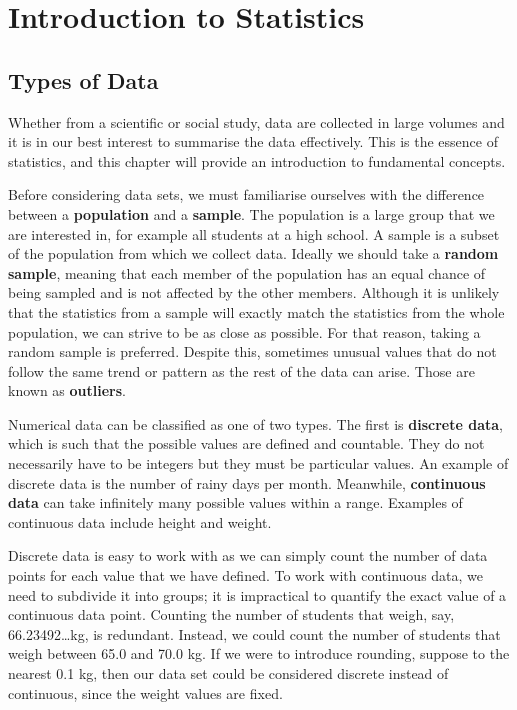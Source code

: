 \chapter{Introduction to Statistics}

\section{Types of Data}
Whether from a scientific or social study, data are collected in large volumes and it is in our best interest to summarise the data effectively. This is the essence of statistics, and this chapter will provide an introduction to fundamental concepts.

Before considering data sets, we must familiarise ourselves with the difference between a \textbf{population} and a \textbf{sample}. The population is a large group that we are interested in, for example all students at a high school. A sample is a subset of the population from which we collect data. Ideally we should take a \textbf{random sample}, meaning that each member of the population has an equal chance of being sampled and is not affected by the other members. Although it is unlikely that the statistics from a sample will exactly match the statistics from the whole population, we can strive to be as close as possible. For that reason, taking a random sample is preferred. Despite this, sometimes unusual values that do not follow the same trend or pattern as the rest of the data can arise. Those are known as \textbf{outliers}.

Numerical data can be classified as one of two types. The first is \textbf{discrete data}, which is such that the possible values are defined and countable. They do not necessarily have to be integers but they must be particular values. An example of discrete data is the number of rainy days per month. Meanwhile, \textbf{continuous data} can take infinitely many possible values within a range. Examples of continuous data include height and weight.

Discrete data is easy to work with as we can simply count the number of data points for each value that we have defined. To work with continuous data, we need to subdivide it into groups; it is impractical to quantify the exact value of a continuous data point. Counting the number of students that weigh, say, 66.23492\dots kg, is redundant. Instead, we could count the number of students that weigh between 65.0 and 70.0 kg. If we were to introduce rounding, suppose to the nearest 0.1 kg, then our data set could be considered discrete instead of continuous, since the weight values are fixed.

